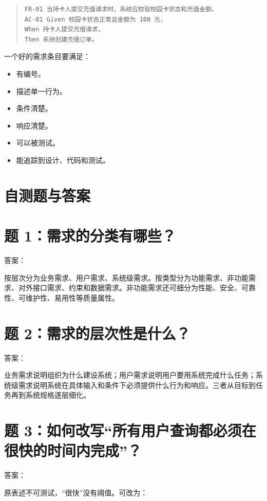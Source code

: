 \documentclass[UTF8,zihao=-4]{ctexart}
\begin{document}
\begin{quote}
\footnotesize
\begin{verbatim}
FR-01 当持卡人提交充值请求时，系统应校验校园卡状态和充值金额。
AC-01 Given 校园卡状态正常且金额为 100 元，
When 持卡人提交充值请求，
Then 系统创建充值订单。
\end{verbatim}
\end{quote}

一个好的需求条目要满足：

\begin{itemize}
\item 有编号。
\item 描述单一行为。
\item 条件清楚。
\item 响应清楚。
\item 可以被测试。
\item 能追踪到设计、代码和测试。
\end{itemize}

\section{自测题与答案}

\section{题 1：需求的分类有哪些？}

答案：

按层次分为业务需求、用户需求、系统级需求。按类型分为功能需求、非功能需求、对外接口需求、约束和数据需求。非功能需求还可细分为性能、安全、可靠性、可维护性、易用性等质量属性。

\section{题 2：需求的层次性是什么？}

答案：

业务需求说明组织为什么建设系统；用户需求说明用户要用系统完成什么任务；系统级需求说明系统在具体输入和条件下必须提供什么行为和响应。三者从目标到任务再到系统规格逐层细化。

\section{题 3：如何改写“所有用户查询都必须在很快的时间内完成”？}

答案：

原表述不可测试，“很快”没有阈值。可改为：
\end{document}
